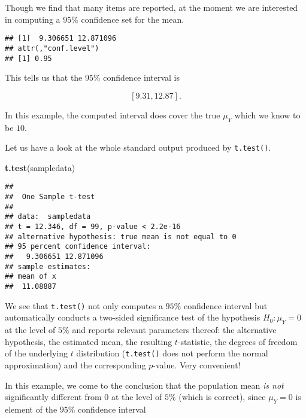 \documentclass[]{book}
\newenvironment{Shaded}{\begin{snugshade}}{\end{snugshade}}
\newcommand{\KeywordTok}[1]{\textcolor[rgb]{0.13,0.29,0.53}{\textbf{#1}}}
\newcommand{\StringTok}[1]{\textcolor[rgb]{0.31,0.60,0.02}{#1}}
\newcommand{\OperatorTok}[1]{\textcolor[rgb]{0.81,0.36,0.00}{\textbf{#1}}}
\newcommand{\NormalTok}[1]{#1}
\theoremstyle{definition}
\theoremstyle{definition}
\theoremstyle{definition}
\theoremstyle{remark}
\begin{document}
Though we find that many items are reported, at the moment we are
interested in computing a \(95\%\) confidence set for the mean.

\begin{Shaded}
\end{Shaded}

\begin{verbatim}
## [1]  9.306651 12.871096
## attr(,"conf.level")
## [1] 0.95
\end{verbatim}

This tells us that the \(95\%\) confidence interval is

\[ \left[9.31, 12.87\right]. \]

In this example, the computed interval does cover the true \(\mu_Y\)
which we know to be \(10\).

Let us have a look at the whole standard output produced by
\texttt{t.test()}.

\begin{Shaded}
\begin{Highlighting}[]
\KeywordTok{t.test}\NormalTok{(sampledata)}
\end{Highlighting}
\end{Shaded}

\begin{verbatim}
## 
##  One Sample t-test
## 
## data:  sampledata
## t = 12.346, df = 99, p-value < 2.2e-16
## alternative hypothesis: true mean is not equal to 0
## 95 percent confidence interval:
##   9.306651 12.871096
## sample estimates:
## mean of x 
##  11.08887
\end{verbatim}

We see that \texttt{t.test()} not only computes a \(95\%\) confidence
interval but automatically conducts a two-sided significance test of the
hypothesis \(H_0: \mu_Y = 0\) at the level of \(5\%\) and reports
relevant parameters thereof: the alternative hypothesis, the estimated
mean, the resulting \(t\)-statistic, the degrees of freedom of the
underlying \(t\) distribution (\texttt{t.test()} does not perform the
normal approximation) and the corresponding \(p\)-value. Very
convenient!

In this example, we come to the conclusion that the population mean
\emph{is not} significantly different from \(0\) at the level of \(5\%\)
(which is correct), since \(\mu_Y = 0\) is element of the \(95\%\)
confidence interval
\end{document}

